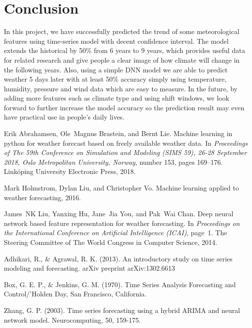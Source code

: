 \documentclass[runningheads]{llncs}
\begin{document}
\section{Conclusion}
In this project, we have successfully predicted the trend of some meteorological features using time-series model with decent confidence interval. The model extends the historical by 50\% from 6 years to 9 years, which provides useful data for related research and give people a clear image of how climate will change in the following years. Also, using a simple DNN model we are able to predict weather 5 days later with at least 50\% accuracy simply using temperature, humidity, pressure and wind data which are easy to measure. In the future, by adding more features such as climate type and using shift windows, we look forward to further increase the model accuracy so the prediction result may even have practical use in people's daily lives.

\begin{thebibliography}{8}
    Erik Abrahamsen, Ole~Magnus Brastein, and Bernt Lie.
    \newblock Machine learning in python for weather forecast based on freely
    available weather data.
    \newblock In {\em Proceedings of The 59th Conference on Simulation and
    Modeling (SIMS 59), 26-28 September 2018, Oslo Metropolitan University,
    Norway}, number 153, pages 169--176. Link{\"o}ping University Electronic
    Press, 2018.
    
    Mark Holmstrom, Dylan Liu, and Christopher Vo.
    \newblock Machine learning applied to weather forecasting, 2016.

    James~NK Liu, Yanxing Hu, Jane~Jia You, and Pak~Wai Chan.
    \newblock Deep neural network based feature representation for weather
    forecasting.
    \newblock In {\em Proceedings on the International Conference on Artificial
    Intelligence (ICAI)}, page~1. The Steering Committee of The World Congress in
    Computer Science, 2014.

    Adhikari, R., \& Agrawal, R. K. (2013). An introductory study on time series modeling and forecasting. arXiv preprint arXiv:1302.6613

    Box, G. E. P., \& Jenkins, G. M. (1970). Time Series Analysis Forecasting and Control/'Holden Day, San Francisco, California.

    Zhang, G. P. (2003). Time series forecasting using a hybrid ARIMA and neural network model. Neurocomputing, 50, 159-175.
\end{thebibliography}
\end{document}

